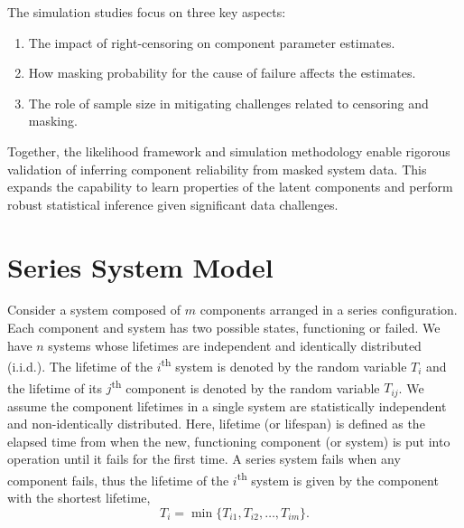 \documentclass[
]{article}
\providecommand{\tightlist}{%
  \setlength{\itemsep}{0pt}\setlength{\parskip}{0pt}}
\theoremstyle{definition}
\theoremstyle{plain}
\theoremstyle{definition}
\theoremstyle{definition}
\theoremstyle{definition}
\theoremstyle{definition}
\theoremstyle{remark}
\begin{document}
The simulation studies focus on three key aspects:

\begin{enumerate}
\def\labelenumi{\arabic{enumi}.}
\tightlist
\item
  The impact of right-censoring on component parameter estimates.
\item
  How masking probability for the cause of failure affects the estimates.
\item
  The role of sample size in mitigating challenges related to censoring and masking.
\end{enumerate}

Together, the likelihood framework and simulation methodology enable rigorous
validation of inferring component reliability from masked system data.
This expands the capability to learn properties of the latent components and
perform robust statistical inference given significant data challenges.

\hypertarget{statmod}{%
\section{Series System Model}\label{statmod}}

Consider a system composed of \(m\) components arranged in a series configuration.
Each component and system has two possible states, functioning or failed.
We have \(n\) systems whose lifetimes are independent and identically distributed
(i.i.d.).
The lifetime of the \(i\)\textsuperscript{th} system is denoted by the random
variable \(T_i\) and the lifetime of its \(j\)\textsuperscript{th} component is
denoted by the random variable \(T_{i j}\). We assume the component lifetimes in a
single system are statistically independent and non-identically distributed.
Here, lifetime (or lifespan) is defined as the elapsed time from when the new,
functioning component (or system) is put into operation until it fails for the
first time. A series system fails when any component fails, thus the lifetime of
the \(i\)\textsuperscript{th} system is given by the component with the shortest
lifetime,
\[
    T_i = \min\bigl\{T_{i 1},T_{i 2}, \ldots, T_{i m} \bigr\}.
\]
\end{document}
